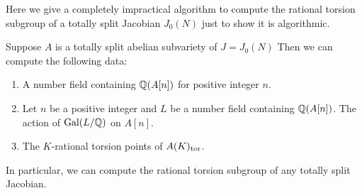 Here we give a completely impractical algorithm to compute the rational torsion
subgroup of a totally split Jacobian $J_0(N)$ just to show it is algorithmic.
\begin{proposition}
    Suppose $A$ is a totally split abelian subvariety of $J=J_0(N)$ Then we can
    compute the following data:
    \begin{enumerate}
        \item
            A number field containing $\mathbb{Q}(A[n])$ for positive integer $n$.
        \item
            Let $n$ be a positive integer and $L$ be a number field containing
            $\mathbb{Q}(A[n])$. The action of $\operatorname{Gal}(L/\mathbb{Q})$ on $A[n]$.
        \item
            The $K$-rational torsion points of $A(K)_{\mathrm{tor}}$.
    \end{enumerate}
    In particular, we can compute the rational torsion subgroup of any totally
    split Jacobian.
\end{proposition}
